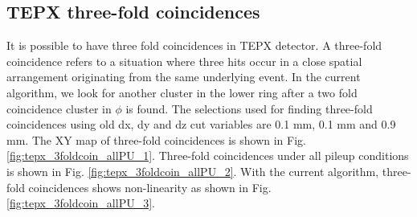 \subsection{TEPX three-fold coincidences}

It is possible to have three fold coincidences in TEPX detector. A three-fold coincidence refers to a situation where three hits occur in a close spatial arrangement originating from the same underlying event. In the current algorithm, we look for another cluster in the lower ring after a two fold coincidence cluster in $\phi$ is found. The selections used for finding three-fold coincidences using old dx, dy and dz cut variables are 0.1 mm, 0.1 mm and 0.9 mm. The XY map of three-fold coincidences is shown in Fig. \ref{fig:tepx_3foldcoin_allPU_1}. Three-fold coincidences under all pileup conditions is shown in Fig.  \ref{fig:tepx_3foldcoin_allPU_2}.  With the current algorithm, three-fold coincidences shows non-linearity as shown in Fig. \ref{fig:tepx_3foldcoin_allPU_3}. %

